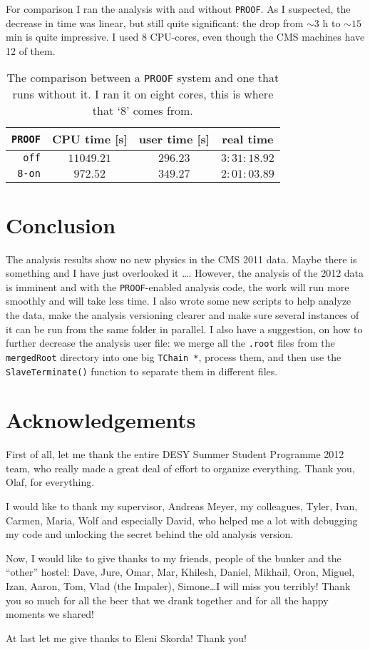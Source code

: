 \documentclass[a4paper, 12 pt, titlepage, twocolumn]{article}
\begin{document}
For comparison I ran the analysis with and without {\tt PROOF}. As I suspected, the decrease in time was
linear, but still quite significant: the drop from $\sim 3$ h to $\sim 15$ min is quite impressive. I used
8 CPU-cores, even though the CMS machines have 12 of them.

\begin{table}[H]\centering\small
	\caption{The comparison between a {\tt PROOF} system and one that runs without it. I ran it on eight
		cores, this is where that `8' comes from.}
	\begin{tabular}{r|c|c|c}
		{\tt PROOF} & CPU time [s]& user time [s] & real time\\
		\hline
		{\tt off} & $11049.21$ & $296.23$ & $3:31:18.92$\\
		\hline
		{\tt 8-on} & $972.52$ & $349.27$ & $2:01:03.89$
	\end{tabular}
	\label{tab:proof}
\end{table}

\section{Conclusion}

The analysis results show no new physics in the CMS 2011 data. Maybe there is something and I have just
overlooked it \ldots. However, the analysis of the 2012 data is imminent and with the {\tt PROOF}-enabled
analysis code, the work will run more smoothly and will take less time. I also wrote some new scripts to help
analyze the data, make the analysis versioning clearer and make sure several instances of it can be run from
the same folder in parallel. I also have a suggestion, on how to further decrease the analysis user file:
we merge all the {\tt .root} files from the {\tt mergedRoot} directory into one big {\tt TChain *},
process them, and then use the {\tt SlaveTerminate()} function to separate them in different files.

\section{Acknowledgements}
First of all, let me thank the entire DESY Summer Student Programme 2012 team, who really made a great deal
of effort to organize everything. Thank you, Olaf, for everything. 

I would like to thank my supervisor, Andreas Meyer, my colleagues, Tyler, Ivan, Carmen, Maria, Wolf and
especially David, who helped me a lot with debugging my code and unlocking the secret behind the old
analysis version.

Now, I would like to give thanks to my friends, people of the bunker and the ``other'' hostel:
 Dave, Jure, Omar, Mar, Khilesh, Daniel, Mikhail, Oron,
Miguel, Izan, Aaron, Tom, Vlad (the Impaler), Simone\ldots I will miss you terribly! Thank you so much for all
the beer that we drank together and for all the happy moments we shared!

At last let me give thanks to Eleni Skorda! Thank you!
\end{document}
